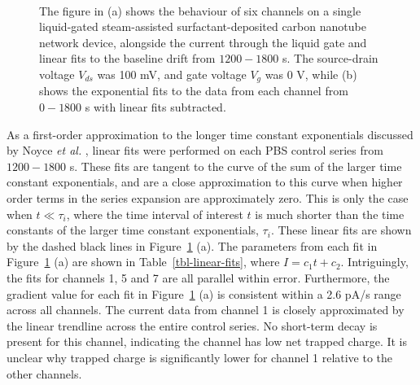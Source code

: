 \documentclass[
  a4paper,
]{scrbook}
\begin{document}
\begin{figure}
\begin{minipage}[t]{0.70\linewidth}
{{}

}

\end{minipage}%
%
\begin{minipage}[t]{0.15\linewidth}

{\centering 

~

}

\end{minipage}%

\caption[Salt concentration control series across six device channels,
with linear and exponential fits to the baseline drift of each
channel.]{\label{fig-salt-conc-control-series}The figure in (a) shows
the behaviour of six channels on a single liquid-gated steam-assisted
surfactant-deposited carbon nanotube network device, alongside the
current through the liquid gate and linear fits to the baseline drift
from \(1200-1800\) s. The source-drain voltage \(V_{ds}\) was 100 mV,
and gate voltage \(V_{g}\) was 0 V, while (b) shows the exponential fits
to the data from each channel from \(0-1800\) s with linear fits
subtracted.}

\end{figure}

As a first-order approximation to the longer time constant exponentials
discussed by Noyce \emph{et al.} \autocite{Noyce2019}, linear fits were
performed on each PBS control series from \(1200-1800\) s. These fits
are tangent to the curve of the sum of the larger time constant
exponentials, and are a close approximation to this curve when higher
order terms in the series expansion are approximately zero. This is only
the case when \(t\ll\tau_i\), where the time interval of interest \(t\)
is much shorter than the time constants of the larger time constant
exponentials, \(\tau_i\). These linear fits are shown by the dashed
black lines in Figure~\ref{fig-salt-conc-control-series} (a). The
parameters from each fit in Figure~\ref{fig-salt-conc-control-series}
(a) are shown in Table~\ref{tbl-linear-fits}, where \(I = c_1t + c_2\).
Intriguingly, the fits for channels 1, 5 and 7 are all parallel within
error. Furthermore, the gradient value for each fit in
Figure~\ref{fig-salt-conc-control-series} (a) is consistent within a 2.6
pA/s range across all channels. The current data from channel 1 is
closely approximated by the linear trendline across the entire control
series. No short-term decay is present for this channel, indicating the
channel has low net trapped charge. It is unclear why trapped charge is
significantly lower for channel 1 relative to the other channels.
\end{document}
